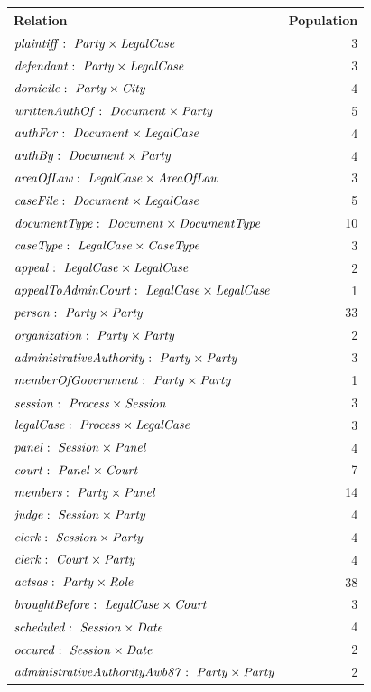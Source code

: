 \documentclass[10pt,a4paper]{report}              %
\theoremstyle{plain}\theorembodyfont{\rmfamily}\newtheorem{definition}{Definition}[section]
\theoremstyle{plain}\theorembodyfont{\rmfamily}\newtheorem{designrule}[definition]{Requirement}
\def\id#1{\mbox{\em #1\/}}
\newcommand{\rel}{\times}
\newcommand{\declare}[3]{\id{#1}:\ \id{#2}\rel\id{#3}}
\begin{document}
\begin{center}
\begin{tabular}{lr}
Relation & Population\\
\hline
$\declare{plaintiff}{Party}{LegalCase}$ & 3\\
$\declare{defendant}{Party}{LegalCase}$ & 3\\
$\declare{domicile}{Party}{City}$ & 4\\
$\declare{writtenAuthOf}{Document}{Party}$ & 5\\
$\declare{authFor}{Document}{LegalCase}$ & 4\\
$\declare{authBy}{Document}{Party}$ & 4\\
$\declare{areaOfLaw}{LegalCase}{AreaOfLaw}$ & 3\\
$\declare{caseFile}{Document}{LegalCase}$ & 5\\
$\declare{documentType}{Document}{DocumentType}$ & 10\\
$\declare{caseType}{LegalCase}{CaseType}$ & 3\\
$\declare{appeal}{LegalCase}{LegalCase}$ & 2\\
$\declare{appealToAdminCourt}{LegalCase}{LegalCase}$ & 1\\
$\declare{person}{Party}{Party}$ & 33\\
$\declare{organization}{Party}{Party}$ & 2\\
$\declare{administrativeAuthority}{Party}{Party}$ & 3\\
$\declare{memberOfGovernment}{Party}{Party}$ & 1\\
$\declare{session}{Process}{Session}$ & 3\\
$\declare{legalCase}{Process}{LegalCase}$ & 3\\
$\declare{panel}{Session}{Panel}$ & 4\\
$\declare{court}{Panel}{Court}$ & 7\\
$\declare{members}{Party}{Panel}$ & 14\\
$\declare{judge}{Session}{Party}$ & 4\\
$\declare{clerk}{Session}{Party}$ & 4\\
$\declare{clerk}{Court}{Party}$ & 4\\
$\declare{actsas}{Party}{Role}$ & 38\\
$\declare{broughtBefore}{LegalCase}{Court}$ & 3\\
$\declare{scheduled}{Session}{Date}$ & 4\\
$\declare{occured}{Session}{Date}$ & 2\\
$\declare{administrativeAuthorityAwb87}{Party}{Party}$ & 2\\

\end{tabular}
\end{center}
\end{document}
